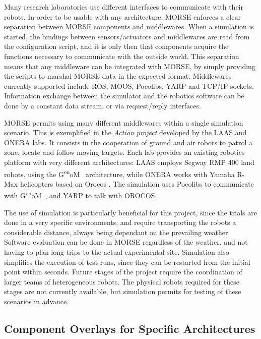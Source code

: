 \documentclass{llncs}
\def\genom{G\textsuperscript{en}oM~}
\begin{document}
Many research laboratories use different interfaces to communicate with their
robots. In order to be usable with any architecture, MORSE enforces a
clear separation between MORSE components and middlewares. When a simulation is started,
the bindings between sensors/actuators and middlewares are read from the
configuration script, and it is only then that components acquire the functions
necessary to communicate with the outside world.
This separation means that any middleware can be integrated with MORSE, by
simply providing the scripts to marshal MORSE data in the expected format.
Middlewares currently supported include ROS, MOOS, Pocolibs, YARP and
TCP/IP sockets.
Information exchange between the simulator and the robotics software can be
done by a constant data stream, or via request/reply interfaces.

MORSE permits using many different middlewares within a single simulation
scenario. This is exemplified in the \emph{Action project} \cite{6106782}
developed by the LAAS and ONERA labs.
It consists in the cooperation of ground and air robots to patrol a zone,
locate and follow moving targets.
Each lab provides an existing robotics platform with very different
architectures: LAAS employs Segway RMP 400 land robots, using the \genom
\cite{MALLET-2011-599677} architecture, while ONERA works with Yamaha R-Max
helicopters based on Orocos \cite{orocos2003}. The simulation uses Pocolibs to
communicate with \genom, and YARP to talk with OROCOS.

The use of simulation is particularly beneficial for this project, since the trials
are done in a very specific environments, and require transporting the robots a
considerable distance, always being dependant on the prevailing weather.
Software evaluation can be done in MORSE regardless of the weather, and not
having to plan long trips to the actual experimental site.
Simulation also simplifies the execution of test runs, since they can be
restarted from the initial point within seconds.  Future stages of the project
require the coordination of larger teams of heterogeneous robots. The physical
robots required for these stages are not currently available, but simulation
permits for testing of these scenarios in advance.


\subsection{Component Overlays for Specific Architectures}
\label{section:overlays}
\end{document}
